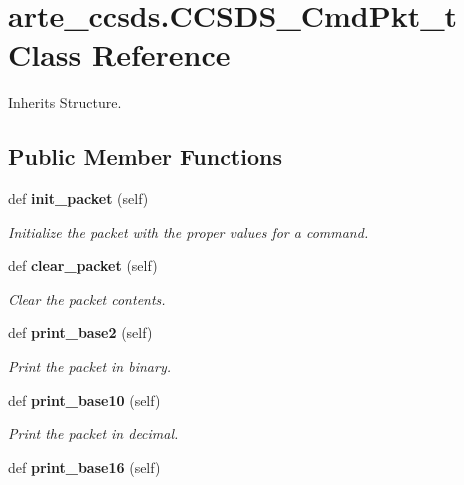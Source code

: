 \section{arte\+\_\+ccsds.\+C\+C\+S\+D\+S\+\_\+\+Cmd\+Pkt\+\_\+t Class Reference}
\label{classarte__ccsds_1_1_c_c_s_d_s___cmd_pkt__t}


Inherits Structure.

\subsection*{Public Member Functions}
\begin{DoxyCompactItemize}
\item 
def {\bf init\+\_\+packet} (self)
\begin{DoxyCompactList}\small\item\em Initialize the packet with the proper values for a command. \end{DoxyCompactList}\item 
def {\bf clear\+\_\+packet} (self)
\begin{DoxyCompactList}\small\item\em Clear the packet contents. \end{DoxyCompactList}\item 
def {\bf print\+\_\+base2} (self)
\begin{DoxyCompactList}\small\item\em Print the packet in binary. \end{DoxyCompactList}\item 
def {\bf print\+\_\+base10} (self)
\begin{DoxyCompactList}\small\item\em Print the packet in decimal. \end{DoxyCompactList}\item 
def {\bf print\+\_\+base16} (self)\label{classarte__ccsds_1_1_c_c_s_d_s___cmd_pkt__t_a30491d0fbd434672690aa677c27b4e9a}


\end{DoxyCompactItemize}
